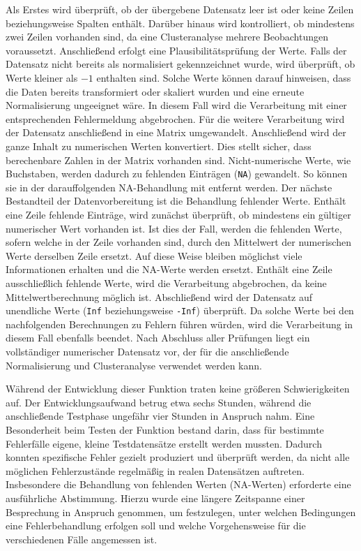 \documentclass[12pt]{article}
\begin{document}
Als Erstes wird überprüft, ob der übergebene Datensatz leer ist oder keine Zeilen beziehungsweise Spalten enthält. Darüber hinaus wird kontrolliert, ob mindestens zwei Zeilen vorhanden sind, da eine Clusteranalyse mehrere Beobachtungen voraussetzt.
Anschließend erfolgt eine Plausibilitätsprüfung der Werte. Falls der Datensatz nicht bereits als normalisiert gekennzeichnet wurde, wird überprüft, ob Werte kleiner als $-1$ enthalten sind. Solche Werte können darauf hinweisen, dass die Daten bereits transformiert oder skaliert wurden und eine erneute Normalisierung ungeeignet wäre. In diesem Fall wird die Verarbeitung mit einer entsprechenden Fehlermeldung abgebrochen.
Für die weitere Verarbeitung wird der Datensatz anschließend in eine Matrix umgewandelt. Anschließend wird der ganze Inhalt zu numerischen Werten konvertiert. Dies stellt sicher, dass berechenbare Zahlen in der Matrix vorhanden sind. Nicht-numerische Werte, wie Buchstaben, werden dadurch zu fehlenden Einträgen (\texttt{NA}) gewandelt. So können sie in der darauffolgenden NA-Behandlung mit entfernt werden.
Der nächste Bestandteil der Datenvorbereitung ist die Behandlung fehlender Werte. Enthält eine Zeile fehlende Einträge, wird zunächst überprüft, ob mindestens ein gültiger numerischer Wert vorhanden ist. Ist dies der Fall, werden die fehlenden Werte, sofern welche in der Zeile vorhanden sind, durch den Mittelwert der numerischen Werte derselben Zeile ersetzt. Auf diese Weise bleiben möglichst viele Informationen erhalten und die NA-Werte werden ersetzt. Enthält eine Zeile ausschließlich fehlende Werte, wird die Verarbeitung abgebrochen, da keine Mittelwertberechnung möglich ist.
Abschließend wird der Datensatz auf unendliche Werte (\texttt{Inf} beziehungsweise \texttt{-Inf}) überprüft. Da solche Werte bei den nachfolgenden Berechnungen zu Fehlern führen würden, wird die Verarbeitung in diesem Fall ebenfalls beendet. Nach Abschluss aller Prüfungen liegt ein vollständiger numerischer Datensatz vor, der für die anschließende Normalisierung und Clusteranalyse verwendet werden kann.

Während der Entwicklung dieser Funktion traten keine größeren Schwierigkeiten auf. Der Entwicklungsaufwand betrug etwa sechs Stunden, während die anschließende Testphase ungefähr vier Stunden in Anspruch nahm. Eine Besonderheit beim Testen der Funktion bestand darin, dass für bestimmte Fehlerfälle eigene, kleine Testdatensätze erstellt werden mussten. Dadurch konnten spezifische Fehler gezielt produziert und überprüft werden, da nicht alle möglichen Fehlerzustände regelmäßig in realen Datensätzen auftreten. Insbesondere die Behandlung von fehlenden Werten (NA-Werten) erforderte eine ausführliche Abstimmung. Hierzu wurde eine längere Zeitspanne einer Besprechung in Anspruch genommen, um festzulegen, unter welchen Bedingungen eine Fehlerbehandlung erfolgen soll und welche Vorgehensweise für die verschiedenen Fälle angemessen ist.
\end{document}
